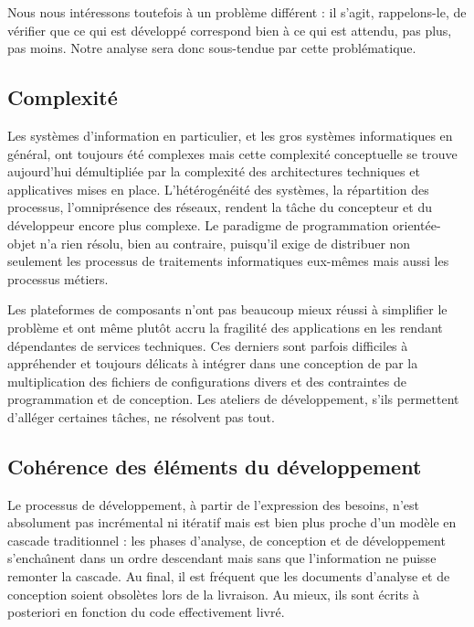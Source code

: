 Nous nous int\'eressons toutefois \`a un probl\`eme diff\'erent :
il s'agit, rappelons-le, de v\'erifier que ce qui est d\'evelopp\'e
correspond bien \`a ce qui est attendu, pas plus, pas moins. Notre
analyse sera donc sous-tendue par cette probl\'ematique.

\subsection{Complexit\'e}

Les syst\`emes d'information en particulier, et les gros syst\`emes
informatiques en g\'en\'eral, ont toujours \'et\'e complexes mais
cette complexit\'e conceptuelle se trouve aujourd'hui
d\'emultipli\'ee par la complexit\'e des architectures techniques
et applicatives mises en place. L'h\'et\'erog\'en\'eit\'e des
syst\`emes, la r\'epartition des processus, l'omnipr\'esence des
r\'eseaux, rendent la t\^ache du concepteur et du d\'eveloppeur
encore plus complexe. Le \og paradigme \fg{} de programmation
orient\'ee-objet n'a rien r\'esolu, bien au contraire, puisqu'il
exige de distribuer non seulement les processus de traitements
informatiques eux-m\^emes mais aussi les processus m\'etiers. 

Les plateformes de composants n'ont pas beaucoup mieux r\'eussi \`a
simplifier le probl\`eme et ont m\^eme plut\^ot accru la
fragilit\'e des applications en les rendant d\'ependantes de
services techniques. Ces derniers sont  parfois difficiles \`a appr\'ehender et toujours
d\'elicats \`a int\'egrer dans une conception de par la
multiplication des fichiers de configurations divers et des
contraintes de programmation et de conception.
Les ateliers de d\'eveloppement, s'ils permettent d'all\'eger
certaines t\^aches, ne r\'esolvent pas tout. 

\subsection{Coh\'erence des \'el\'ements du d\'eveloppement}

Le processus de d\'eveloppement, \`a partir de l'expression des
besoins, n'est absolument pas incr\'emental ni it\'eratif
mais est bien plus proche d'un mod\`ele en cascade traditionnel : les
phases d'analyse, de conception et de d\'eveloppement s'encha\^{\i}nent
dans un ordre descendant mais sans que l'information ne puisse
remonter la \og cascade\fg{}. Au final, il est fr\'equent que les
documents d'analyse et de conception soient obsol\`etes lors de la
livraison. Au mieux, ils sont \'ecrits \`a posteriori en
fonction du code effectivement livr\'e. 

